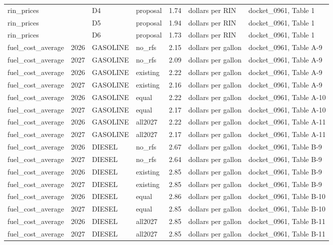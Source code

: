 \begin{longtable}{p{2.3cm}p{0.7cm}p{1.0cm}p{2.6cm}rp{1.7cm}p{4.6cm}}
rin\_prices &  & D4 & proposal & 1.74 & dollars per RIN & docket\_0961, Table 1 \\
rin\_prices &  & D5 & proposal & 1.94 & dollars per RIN & docket\_0961, Table 1 \\
rin\_prices &  & D6 & proposal & 1.73 & dollars per RIN & docket\_0961, Table 1 \\
fuel\_cost\_average & 2026 & GASOLINE & no\_rfs & 2.15 & dollars per gallon & docket\_0961, Table A-9 \\
fuel\_cost\_average & 2027 & GASOLINE & no\_rfs & 2.09 & dollars per gallon & docket\_0961, Table A-9 \\
fuel\_cost\_average & 2026 & GASOLINE & existing & 2.22 & dollars per gallon & docket\_0961, Table A-9 \\
fuel\_cost\_average & 2027 & GASOLINE & existing & 2.16 & dollars per gallon & docket\_0961, Table A-9 \\
fuel\_cost\_average & 2026 & GASOLINE & equal & 2.22 & dollars per gallon & docket\_0961, Table A-10 \\
fuel\_cost\_average & 2027 & GASOLINE & equal & 2.17 & dollars per gallon & docket\_0961, Table A-10 \\
fuel\_cost\_average & 2026 & GASOLINE & all2027 & 2.22 & dollars per gallon & docket\_0961, Table A-11 \\
fuel\_cost\_average & 2027 & GASOLINE & all2027 & 2.17 & dollars per gallon & docket\_0961, Table A-11 \\
fuel\_cost\_average & 2026 & DIESEL & no\_rfs & 2.67 & dollars per gallon & docket\_0961, Table B-9 \\
fuel\_cost\_average & 2027 & DIESEL & no\_rfs & 2.64 & dollars per gallon & docket\_0961, Table B-9 \\
fuel\_cost\_average & 2026 & DIESEL & existing & 2.85 & dollars per gallon & docket\_0961, Table B-9 \\
fuel\_cost\_average & 2027 & DIESEL & existing & 2.85 & dollars per gallon & docket\_0961, Table B-9 \\
fuel\_cost\_average & 2026 & DIESEL & equal & 2.86 & dollars per gallon & docket\_0961, Table B-10 \\
fuel\_cost\_average & 2027 & DIESEL & equal & 2.85 & dollars per gallon & docket\_0961, Table B-10 \\
fuel\_cost\_average & 2026 & DIESEL & all2027 & 2.85 & dollars per gallon & docket\_0961, Table B-11 \\
fuel\_cost\_average & 2027 & DIESEL & all2027 & 2.85 & dollars per gallon & docket\_0961, Table B-11 \\

\end{longtable}
